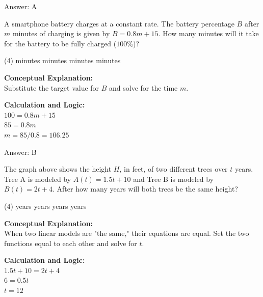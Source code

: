 \documentclass[11pt,paper=a4,answers]{exam}
\begin{document}
\begin{questions}
\begin{solution}
\vspace{15pt}
Answer: \colorbox{yellow!100}{A}
\end{solution}

\vspace{20pt}

\question
A smartphone battery charges at a constant rate. The battery percentage $B$ after $m$ minutes of charging is given by $B = 0.8m + 15$. How many minutes will it take for the battery to be fully charged ($100\%$)?
\begin{tasks}(4)
     minutes
     minutes
     minutes
     minutes
\end{tasks}

\begin{solution}
\textbf{Conceptual Explanation:} \\
Substitute the target value for $B$ and solve for the time $m$.

\vspace{10pt}
\textbf{Calculation and Logic:} \\
$100 = 0.8m + 15$ \\
$85 = 0.8m$ \\
$m = 85 / 0.8 = 106.25$

\vspace{15pt}
Answer: \colorbox{yellow!100}{B}
\end{solution}

\vspace{20pt}

\question

The graph above shows the height $H$, in feet, of two different trees over $t$ years. Tree A is modeled by $A(t) = 1.5t + 10$ and Tree B is modeled by $B(t) = 2t + 4$. After how many years will both trees be the same height?
\begin{tasks}(4)
     years
     years
     years
     years
\end{tasks}

\begin{solution}
\textbf{Conceptual Explanation:} \\
When two linear models are "the same," their equations are equal. Set the two functions equal to each other and solve for $t$.

\vspace{10pt}
\textbf{Calculation and Logic:} \\
$1.5t + 10 = 2t + 4$ \\
$6 = 0.5t$ \\
$t = 12$


\end{solution}
\end{questions}
\end{document}
